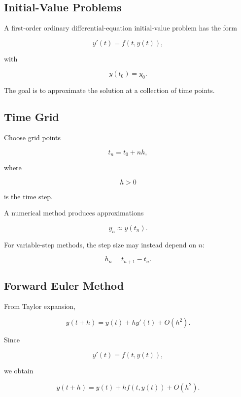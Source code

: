 \subsection{Initial-Value Problems}
\label{subsec:numerical-ode-ivp}

A first-order ordinary differential-equation initial-value problem has the
form

\[
\boxed{
y'(t)
=
f(t,y(t)),
}
\]

with

\[
\boxed{
y(t_0)
=
y_0.
}
\]

The goal is to approximate the solution at a collection of time points.

\subsection{Time Grid}
\label{subsec:ode-time-grid}

Choose grid points

\[
\boxed{
t_n
=
t_0+nh,
}
\]

where

\[
h>0
\]

is the time step.

A numerical method produces approximations

\[
\boxed{
y_n
\approx
y(t_n).
}
\]

For variable-step methods, the step size may instead depend on \(n\):

\[
\boxed{
h_n
=
t_{n+1}-t_n.
}
\]

\subsection{Forward Euler Method}
\label{subsec:forward-euler}

From Taylor expansion,

\[
y(t+h)
=
y(t)
+
hy'(t)
+
O(h^2).
\]

Since

\[
y'(t)
=
f(t,y(t)),
\]

we obtain

\[
y(t+h)
=
y(t)
+
hf(t,y(t))
+
O(h^2).
\]

